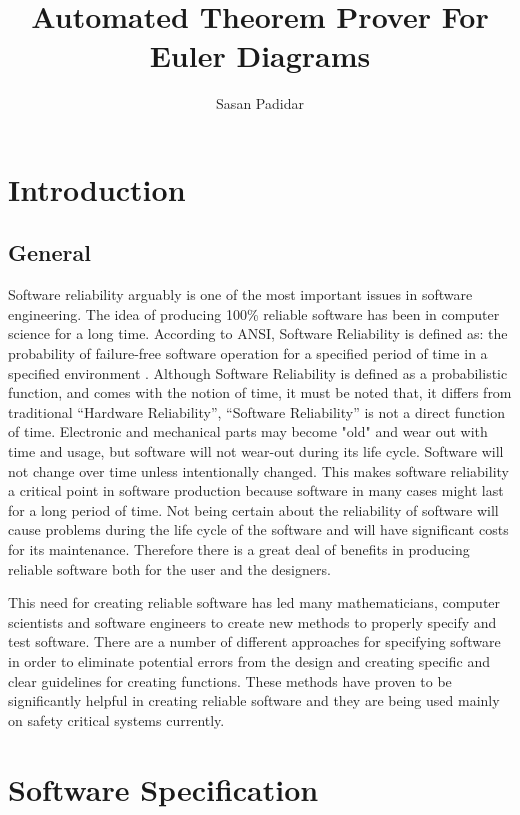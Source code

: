 \documentclass[a4paper]{article}
\title{Automated Theorem Prover For Euler Diagrams}
\author{Sasan Padidar}
\begin{document}
\maketitle
\tableofcontents

\section{Introduction} %
\label{sec:introduction}

\subsection{General}

Software reliability arguably is one of the most important issues in software engineering. The idea of producing 100\% reliable software has been in computer science for a long time. According to ANSI, Software Reliability is defined as: the probability of failure-free software operation for a specified period of time in a specified environment \cite{ANSI_91}. Although Software Reliability is defined as a probabilistic function, and comes with the notion of time, it must be noted that, it  differs from traditional “Hardware Reliability”, “Software Reliability” is not a direct function of time. Electronic and mechanical parts may become "old" and wear out with time and usage, but software will not wear-out during its life cycle. Software will not change over time unless intentionally changed. This makes software reliability a critical point in software production because software in many cases might last for a long period of time. Not being certain about the reliability of software will cause problems during the life cycle of the software and will have significant costs for its maintenance.  Therefore there is a great deal of benefits in producing reliable software both for the user and the designers.

This need for creating reliable software has led many mathematicians, computer scientists and software engineers to create new methods to properly specify and test software. There are a number of different approaches for specifying software in order to eliminate potential errors from the design and creating specific and clear guidelines for creating functions. These methods have proven to be significantly helpful in creating reliable software and they are being used mainly on safety critical systems currently.

\section{Software Specification}
\end{document}
